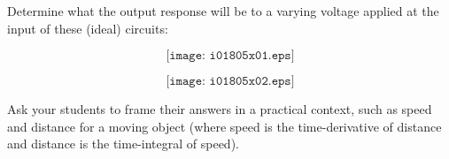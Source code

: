 

Determine what the output response will be to a varying voltage applied at the input of these (ideal) circuits:

$$\texttt{[image: i01805x01.eps]}$$







$$\texttt{[image: i01805x02.eps]}$$







Ask your students to frame their answers in a practical context, such as speed and distance for a moving object (where speed is the time-derivative of distance and distance is the time-integral of speed).




